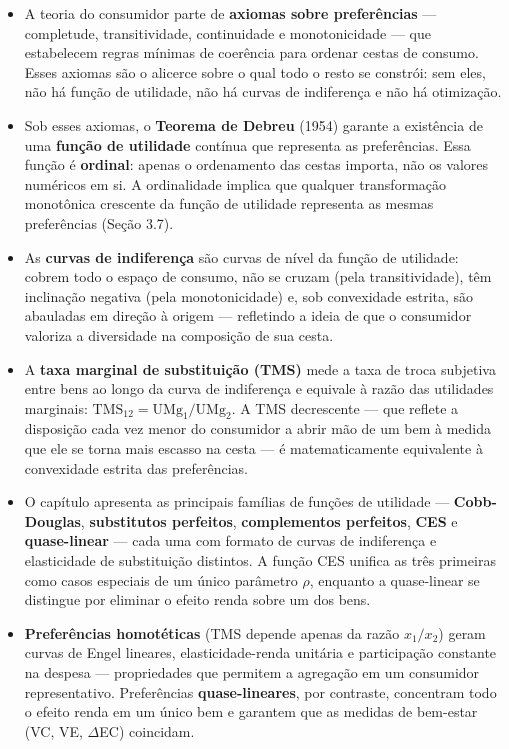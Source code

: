 \documentclass[11pt,twoside,openright]{book}
\providecommand{\tightlist}{\setlength{\itemsep}{0pt}\setlength{\parskip}{0pt}}
\begin{document}
\begin{itemize}
\tightlist
\item
  A teoria do consumidor parte de \textbf{axiomas sobre preferências}
  --- completude, transitividade, continuidade e monotonicidade --- que
  estabelecem regras mínimas de coerência para ordenar cestas de
  consumo. Esses axiomas são o alicerce sobre o qual todo o resto se
  constrói: sem eles, não há função de utilidade, não há curvas de
  indiferença e não há otimização.
\item
  Sob esses axiomas, o \textbf{Teorema de Debreu} (1954) garante a
  existência de uma \textbf{função de utilidade} contínua que representa
  as preferências. Essa função é \textbf{ordinal}: apenas o ordenamento
  das cestas importa, não os valores numéricos em si. A ordinalidade
  implica que qualquer transformação monotônica crescente da função de
  utilidade representa as mesmas preferências (Seção 3.7).
\item
  As \textbf{curvas de indiferença} são curvas de nível da função de
  utilidade: cobrem todo o espaço de consumo, não se cruzam (pela
  transitividade), têm inclinação negativa (pela monotonicidade) e, sob
  convexidade estrita, são abauladas em direção à origem --- refletindo
  a ideia de que o consumidor valoriza a diversidade na composição de
  sua cesta.
\item
  A \textbf{taxa marginal de substituição (TMS)} mede a taxa de troca
  subjetiva entre bens ao longo da curva de indiferença e equivale à
  razão das utilidades marginais:
  \(\text{TMS}_{12} = \text{UMg}_1 / \text{UMg}_2\). A TMS decrescente
  --- que reflete a disposição cada vez menor do consumidor a abrir mão
  de um bem à medida que ele se torna mais escasso na cesta --- é
  matematicamente equivalente à convexidade estrita das preferências.
\item
  O capítulo apresenta as principais famílias de funções de utilidade
  --- \textbf{Cobb-Douglas}, \textbf{substitutos perfeitos},
  \textbf{complementos perfeitos}, \textbf{CES} e \textbf{quase-linear}
  --- cada uma com formato de curvas de indiferença e elasticidade de
  substituição distintos. A função CES unifica as três primeiras como
  casos especiais de um único parâmetro \(\rho\), enquanto a
  quase-linear se distingue por eliminar o efeito renda sobre um dos
  bens.
\item
  \textbf{Preferências homotéticas} (TMS depende apenas da razão
  \(x_1/x_2\)) geram curvas de Engel lineares, elasticidade-renda
  unitária e participação constante na despesa --- propriedades que
  permitem a agregação em um consumidor representativo. Preferências
  \textbf{quase-lineares}, por contraste, concentram todo o efeito renda
  em um único bem e garantem que as medidas de bem-estar (VC, VE,
  \(\Delta\)EC) coincidam.
\end{itemize}
\end{document}
